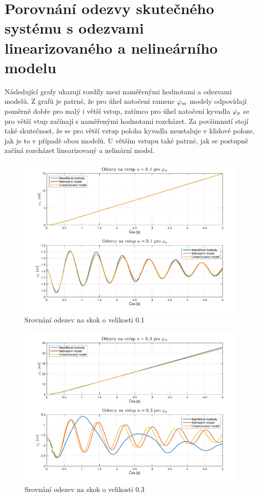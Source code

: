 \documentclass[11pt,a4paper]{article}
\begin{document}
\section{Porovnání odezvy skutečného systému s odezvami linearizovaného a nelineárního modelu}
Následující grafy ukazují rozdíly mezi naměřenými hodnotami a odezvami modelů. Z grafů je patrné, že pro úhel natočení ramene $\phin{m}$ modely odpovídají poměrně dobře pro malý i větší vstup, zatímco pro úhel natočení kyvadla $\phin{p}$ se pro větší vtup začínají s naměřenými hodnotami rozcházet. Za povšimnutí stojí také skutečnost, že se pro větší vstup poloha kyvadla neustaluje v klidové poloze, jak je to v případě obou modelů. U větším vstupu také patrné, jak se postupně začíná rozcházet linearizovaný a nelinární model.

\begin{figure}[H]
\centering
\includegraphics[scale=0.55]{Odezvy01.pdf}
\caption{Srovnání odezev na skok o velikosti 0.1}
\end{figure}

\begin{figure}[H]
\centering
\includegraphics[scale=0.55]{Odezvy03.pdf}
\caption{Srovnání odezev na skok o velikosti 0.3}
\end{figure}
\end{document}
